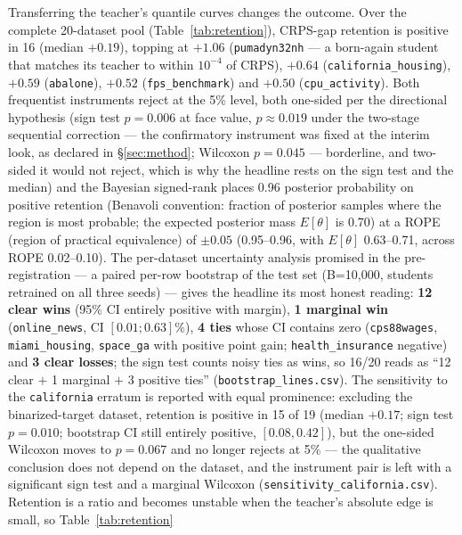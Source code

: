 \documentclass[11pt]{article}
\begin{document}
Transferring the teacher's quantile curves changes the outcome. Over the
complete 20-dataset pool (Table~\ref{tab:retention}), CRPS-gap retention is
positive in 16 (median $+0.19$), topping at $+1.06$ (\texttt{pumadyn32nh}
--- a born-again student that matches its teacher to within
$10^{-4}$ of CRPS), $+0.64$
(\texttt{california\_\allowbreak housing}), $+0.59$ (\texttt{abalone}), $+0.52$
(\texttt{fps\_benchmark}) and $+0.50$ (\texttt{cpu\_activity}). Both
frequentist instruments reject at the 5\% level, both one-sided per the
directional hypothesis (sign test
$p = 0.006$ at face value, $p \approx 0.019$ under the two-stage
sequential correction --- the confirmatory instrument was fixed at the
interim look, as declared in \S\ref{sec:method}; Wilcoxon $p = 0.045$ --- borderline, and two-sided it
would not reject, which is why the headline rests on the sign test and
the median) and the Bayesian signed-rank
\citep{benavoli2017} places 0.96 posterior probability on positive
retention (Benavoli convention: fraction of posterior samples where the
region is most probable; the expected posterior mass $E[\theta]$ is
0.70) at a ROPE (region of practical equivalence) of $\pm 0.05$
(0.95--0.96, with $E[\theta]$ 0.63--0.71,
across ROPE 0.02--0.10). The per-dataset uncertainty analysis promised
in the pre-registration --- a paired per-row bootstrap of the test set
(B=10{,}000, students retrained on all three seeds) --- gives the
headline its most honest reading: \textbf{12 clear wins} (95\% CI
entirely positive with margin), \textbf{1 marginal win}
(\texttt{online\_news}, CI $[0.01; 0.63]\%$), \textbf{4 ties}
whose CI contains zero (\texttt{cps88wages},
\texttt{miami\_housing}, \texttt{space\_ga} with positive point
gain; \texttt{health\_insurance} negative) and \textbf{3 clear
losses}; the sign
test counts noisy ties as wins, so 16/20 reads as ``12 clear $+$ 1
marginal $+$ 3 positive ties'' (\texttt{bootstrap\_lines.csv}). The sensitivity to the \texttt{california}
erratum is reported with equal prominence: excluding the
binarized-target dataset, retention is positive in 15 of 19 (median
$+0.17$; sign test $p = 0.010$; bootstrap CI still entirely positive,
$[0.08, 0.42]$), but the one-sided Wilcoxon moves to $p = 0.067$ and no
longer rejects at 5\% --- the qualitative conclusion does not depend on
the dataset, and the instrument pair is left with a significant sign
test and a marginal Wilcoxon
(\texttt{sensitivity\_\allowbreak california.\allowbreak csv}). Retention is a ratio and becomes unstable when
the teacher's absolute edge is small, so Table~\ref{tab:retention}
\end{document}
